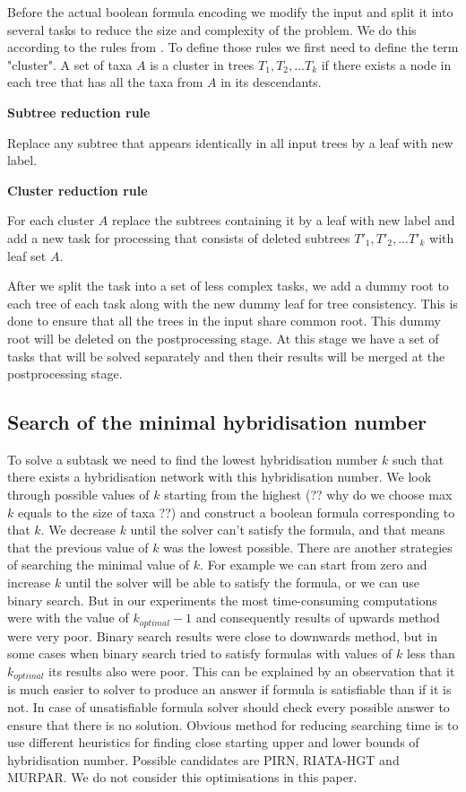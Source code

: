 \documentclass[runningheads, envcountsame, a4paper]{llncs}
\begin{document}
Before the actual boolean formula encoding we modify the input and split it into several tasks to reduce the size and complexity of the problem. We do this according to the rules from \cite {bonet2009efficiently}. To define those rules we first need to define the term "cluster". A set of taxa $A$ is a cluster in trees $T_1, T_2, ... T_k$ if there exists a node in each tree that has all the taxa from $A$ in its descendants.

\textbf{Subtree reduction rule}

Replace any subtree that appears identically in all input trees by a leaf with new label.

\textbf{Cluster reduction rule}

For each cluster $A$ replace the subtrees containing it by a leaf with new label and add a new task for processing that consists of deleted subtrees $T'_1, T'_2, ... T'_k$ with leaf set $A$.

After we split the task into a set of less complex tasks, we add a dummy root to each tree of each task along with the new dummy leaf for tree consistency. This is done to ensure that all the trees in the input share common root. This dummy root will be deleted on the postprocessing stage. At this stage we have a set of tasks that will be solved separately and then their results will be merged at the postprocessing stage.

\subsection{Search of the minimal hybridisation number}

To solve a subtask we need to find the lowest hybridisation number $k$ such that there exists a hybridisation network with this hybridisation number. We look through possible values of $k$ starting from the highest (?? why do we choose max $k$ equals to the size of taxa ??) and construct a boolean formula corresponding to that $k$. We decrease $k$ until the solver can't satisfy the formula, and that means that the previous value of $k$ was the lowest possible. There are another strategies of searching the minimal value of $k$. For example we can start from zero and increase $k$ until the solver will be able to satisfy the formula, or we can use binary search. But in our experiments the most time-consuming computations were with the value of $k_{optimal} - 1$ and consequently results of upwards method were very poor. Binary search results were close to downwards method, but in some cases when binary search tried to satisfy formulas with values of $k$ less than $k_{optimal}$ its results also were poor. This can be explained by an observation that it is much easier to solver to produce an answer if formula is satisfiable than if it is not. In case of unsatisfiable formula solver should check every possible answer to ensure that there is no solution. Obvious method for reducing searching time is to use different heuristics for finding close starting upper and lower bounds of hybridisation number. Possible candidates are PIRN, RIATA-HGT and MURPAR. We do not consider this optimisations in this paper.
\end{document}
